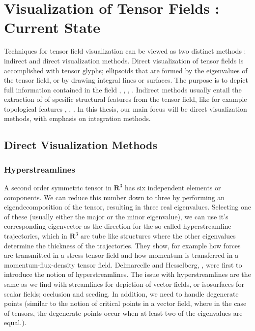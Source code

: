 \documentclass[main.tex]{subfiles}
\begin{document}
\section{Visualization of Tensor Fields : Current State}
\label{sec:3}


Techniques for tensor field visualization can be viewed as two distinct methods : indirect and 
direct visualization methods. Direct visualization of tensor fields is accomplished with tensor
glyphs; ellipsoids that are formed by the eigenvalues of the tensor field, or by drawing integral 
lines or surfaces. The purpose is to depict full information contained in the field 
\cite{BH06}, \cite{KMW05}, \cite{HFH04}, \cite{FA15}. Indirect methods usually entail the 
extraction of of spesific structural features from the tensor field, like for example topological
features \cite{TS03}, \cite{TSH01}, \cite{TZP06}. In this thesis, our main focus will be direct
visualization methods, with emphasis on integration methods.

\subsection{Direct Visualization Methods}
\subsubsection{Hyperstreamlines}
A second order symmetric tensor in $\mathbf{R}^3$ has six independent elements or components.
We can reduce this number down to three by performing an eigendecomposition of the tensor, 
resulting in three real eigenvalues. Selecting one of these (usually either the major or the minor 
eigenvalue), we can use it's corresponding eigenvector as the direction for the so-called 
hyperstreamline trajectories, which in $\mathbf{R}^3$ are tube like structures
where the other eigenvalues determine the thickness of the trajectories. They show, for example 
how forces are transmitted in a stress-tensor field and how momentum is transferred in a 
momentum-flux-density tensor field. Delmarcelle and Hesselberg, \cite{DH92}, were first to 
introduce the notion of hyperstreamlines. The issue with hyperstreamlines are the same as
we find with streamlines for depiction of vector fields, or isosurfaces for scalar fields; 
occlusion and seeding. In addition, we need to handle degenerate points (similar to the notion
of critical points in a vector field, where in the case of tensors, the degenerate points
occur when at least two of the eigenvalues are equal.).
\end{document}
